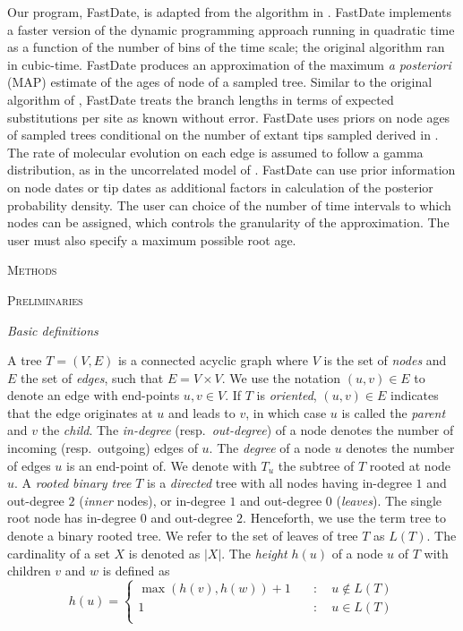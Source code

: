 \documentclass{llncs}
\renewcommand{\section}[1]{%
\bigskip
\begin{center}
\begin{Large}
\normalfont\scshape #1
\medskip
\end{Large}
\end{center}}
\renewcommand{\subsection}[1]{%
\bigskip
\begin{center}
\begin{large}
\normalfont\itshape #1
\end{large}
\end{center}}
\begin{document}
Our program, FastDate, is adapted from the algorithm in \cite{Akerborg2008}.
FastDate implements a faster version of the dynamic programming approach running 
in quadratic time as a function of the number of bins of the time scale;
the original algorithm ran in cubic-time.
FastDate produces an approximation of the maximum {\em a posteriori} (MAP)
estimate of the ages of node of a sampled tree.
Similar to the original algorithm of \cite{Akerborg2008}, FastDate treats
the branch lengths in terms of expected substitutions per site as known without error.
FastDate uses priors on node ages of sampled trees conditional on the 
number of extant tips sampled derived in \cite{Stadler2010}.
The rate of molecular evolution on each edge is assumed to follow a 
gamma distribution, as in the uncorrelated model of \cite{BEASTREF-FOR-THIS-MODEL}.
FastDate can use prior information on node dates or tip dates as additional
factors in calculation of the posterior probability density.
The user can choice of the number of time intervals to which 
nodes can be assigned, which controls the granularity of the approximation.
The user must also specify a maximum possible root age.


\section{Methods}

\section {Preliminaries}
%
%
\subsection{Basic definitions}

%
A tree $T=(V,E)$ is a connected acyclic graph where $V$ is the set of {\em
nodes} and $E$ the set of {\em edges}, such that $E = V\times V$. We use the
notation $(u,v) \in E$ to denote an edge with end-points $u,v \in V$. If $T$ is
{\em oriented}, $(u,v) \in E$ indicates that the edge originates at $u$ and leads
to $v$, in which case $u$ is called the {\em parent} and $v$ the {\em child}.
The {\em in-degree} (resp.~{\em out-degree}) of a node denotes the
number of incoming (resp.~outgoing) edges of $u$. The
{\em degree} of a node $u$ denotes the number of edges $u$ is an end-point of.
We denote with $T_u$ the subtree of $T$ rooted at node $u$.  A {\em
rooted binary tree} $T$ is a {\em directed} tree with all nodes having
in-degree $1$ and out-degree $2$ ({\em inner} nodes), or in-degree $1$ and out-degree
$0$ ({\em leaves}). The single root node has in-degree $0$ and out-degree $2$.  
Henceforth, we use the term tree to denote a
binary rooted tree.  We refer to the set of leaves of tree $T$ as $L(T)$.  The
cardinality of a set $X$ is denoted as $|X|$. The {\em height} $h(u)$ of a node
$u$ of $T$ with children $v$ and $w$ is defined as 
%
\[ h(u) = \left\{ \begin{array}{ll}
\max(h(v), h(w)) + 1 & \quad : \quad u \notin L(T)\\
1                    & \quad : \quad u    \in L(T)\\
\end{array}\right. \] 
\end{document}
